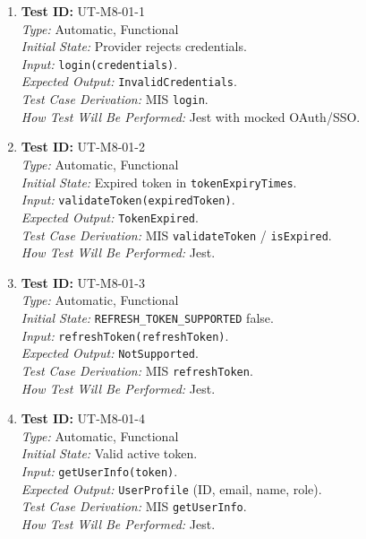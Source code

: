 \documentclass[12pt, titlepage]{article}
\begin{document}
\begin{enumerate}\setlength{\itemsep}{0.85em}
    \item \textbf{Test ID:} UT-M8-01-1\\[0.25em]
    \textit{Type:} Automatic, Functional\\
    \textit{Initial State:} Provider rejects credentials.\\
    \textit{Input:} \texttt{login(credentials)}.\\
    \textit{Expected Output:} \texttt{InvalidCredentials}.\\
    \textit{Test Case Derivation:} MIS \texttt{login}.\\
    \textit{How Test Will Be Performed:} Jest with mocked OAuth/SSO.

    \item \textbf{Test ID:} UT-M8-01-2\\[0.25em]
    \textit{Type:} Automatic, Functional\\
    \textit{Initial State:} Expired token in \texttt{tokenExpiryTimes}.\\
    \textit{Input:} \texttt{validateToken(expiredToken)}.\\
    \textit{Expected Output:} \texttt{TokenExpired}.\\
    \textit{Test Case Derivation:} MIS \texttt{validateToken} / \texttt{isExpired}.\\
    \textit{How Test Will Be Performed:} Jest.

    \item \textbf{Test ID:} UT-M8-01-3\\[0.25em]
    \textit{Type:} Automatic, Functional\\
    \textit{Initial State:} \texttt{REFRESH\_TOKEN\_SUPPORTED} false.\\
    \textit{Input:} \texttt{refreshToken(refreshToken)}.\\
    \textit{Expected Output:} \texttt{NotSupported}.\\
    \textit{Test Case Derivation:} MIS \texttt{refreshToken}.\\
    \textit{How Test Will Be Performed:} Jest.

    \item \textbf{Test ID:} UT-M8-01-4\\[0.25em]
    \textit{Type:} Automatic, Functional\\
    \textit{Initial State:} Valid active token.\\
    \textit{Input:} \texttt{getUserInfo(token)}.\\
    \textit{Expected Output:} \texttt{UserProfile} (ID, email, name, role).\\
    \textit{Test Case Derivation:} MIS \texttt{getUserInfo}.\\
    \textit{How Test Will Be Performed:} Jest.
\end{enumerate}
\end{document}
